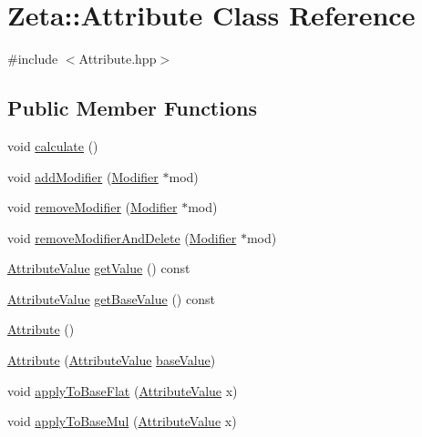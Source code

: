 \hypertarget{classZeta_1_1Attribute}{\section{Zeta\+:\+:Attribute Class Reference}
\label{classZeta_1_1Attribute}
}


{\ttfamily \#include $<$Attribute.\+hpp$>$}

\subsection*{Public Member Functions}
\begin{DoxyCompactItemize}
\item 
void \hyperlink{classZeta_1_1Attribute_a3f9e6340e8ea4b5e9ad74c9898696a0b}{calculate} ()
\item 
void \hyperlink{classZeta_1_1Attribute_a24922604f4f328d952c44be03a0cea0d}{add\+Modifier} (\hyperlink{classZeta_1_1Modifier}{Modifier} $\ast$mod)
\item 
void \hyperlink{classZeta_1_1Attribute_ab99269eaf181406cbf7a154b86af1634}{remove\+Modifier} (\hyperlink{classZeta_1_1Modifier}{Modifier} $\ast$mod)
\item 
void \hyperlink{classZeta_1_1Attribute_ad19018db150427661cec8516ed1e9e51}{remove\+Modifier\+And\+Delete} (\hyperlink{classZeta_1_1Modifier}{Modifier} $\ast$mod)
\item 
\hyperlink{namespaceZeta_ab5947f98c0ab6302b51f8c6e93ec5581}{Attribute\+Value} \hyperlink{classZeta_1_1Attribute_a1b1c22b638e4dc8e2746deb53adb04a8}{get\+Value} () const 
\item 
\hyperlink{namespaceZeta_ab5947f98c0ab6302b51f8c6e93ec5581}{Attribute\+Value} \hyperlink{classZeta_1_1Attribute_af56df540b0a1a253b67ef5eac778a6ee}{get\+Base\+Value} () const 
\item 
\hyperlink{classZeta_1_1Attribute_a9ee74be316ff855f0a2e2f2b2dacacbd}{Attribute} ()
\item 
\hyperlink{classZeta_1_1Attribute_a21ad4fc1a49e3b39d356038ca177182a}{Attribute} (\hyperlink{namespaceZeta_ab5947f98c0ab6302b51f8c6e93ec5581}{Attribute\+Value} \hyperlink{classZeta_1_1Attribute_ab96690c561ec9b78648dafc70bc37529}{base\+Value})
\item 
void \hyperlink{classZeta_1_1Attribute_a7071cfacafb5d9d0b4da3913386f61a7}{apply\+To\+Base\+Flat} (\hyperlink{namespaceZeta_ab5947f98c0ab6302b51f8c6e93ec5581}{Attribute\+Value} x)
\item 
void \hyperlink{classZeta_1_1Attribute_a4d9cecf6c61ba0ea47b825a6fb8d954e}{apply\+To\+Base\+Mul} (\hyperlink{namespaceZeta_ab5947f98c0ab6302b51f8c6e93ec5581}{Attribute\+Value} x)

\end{DoxyCompactItemize}
